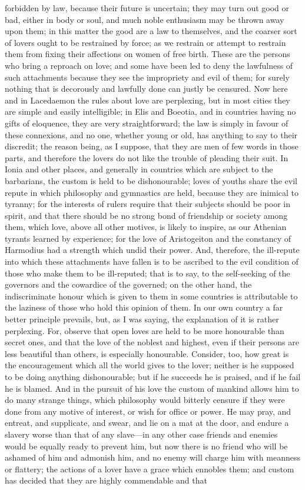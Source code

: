 forbidden by law, because their future is uncertain; they may turn out good or bad, either in body or soul, and much noble enthusiasm may be thrown away upon them; in this matter the good are a law to themselves, and the coarser sort of lovers ought to be restrained by force; as we restrain or attempt to restrain them from fixing their affections on women of free birth. These are the persons who bring a reproach on love; and some have been led to deny the lawfulness of such attachments because they see the impropriety and evil of them; for surely nothing that is decorously and lawfully done can justly be censured. Now here and in Lacedaemon the rules about love are perplexing, but in most cities they are simple and easily intelligible; in Elis and Boeotia, and in countries having no gifts of eloquence, they are very straightforward; the law is simply in favour of these connexions, and no one, whether young or old, has anything to say to their discredit; the reason being, as I suppose, that they are men of few words in those parts, and therefore the lovers do not like the trouble of pleading their suit. In Ionia and other places, and generally in countries which are subject to the barbarians, the custom is held to be dishonourable; loves of youths share the evil repute in which philosophy and gymnastics are held, because they are inimical to tyranny; for the interests of rulers require that their subjects should be poor in spirit, and that there should be no strong bond of friendship or society among them, which love, above all other motives, is likely to inspire, as our Athenian tyrants learned by experience; for the love of Aristogeiton and the constancy of Harmodius had a strength which undid their power. And, therefore, the ill-repute into which these attachments have fallen is to be ascribed to the evil condition of those who make them to be ill-reputed; that is to say, to the self-seeking of the governors and the cowardice of the governed; on the other hand, the indiscriminate honour which is given to them in some countries is attributable to the laziness of those who hold this opinion of them. In our own country a far better principle prevails, but, as I was saying, the explanation of it is rather perplexing. For, observe that open loves are held to be more honourable than secret ones, and that the love of the noblest and highest, even if their persons are less beautiful than others, is especially honourable. Consider, too, how great is the encouragement which all the world gives to the lover; neither is he supposed to be doing anything dishonourable; but if he succeeds he is praised, and if he fail he is blamed. And in the pursuit of his love the custom of mankind allows him to do many strange things, which philosophy would bitterly censure if they were done from any motive of interest, or wish for office or power. He may pray, and entreat, and supplicate, and swear, and lie on a mat at the door, and endure a slavery worse than that of any slave---in any other case friends and enemies would be equally ready to prevent him, but now there is no friend who will be ashamed of him and admonish him, and no enemy will charge him with meanness or flattery; the actions of a lover have a grace which ennobles them; and custom has decided that they are highly commendable and that 
